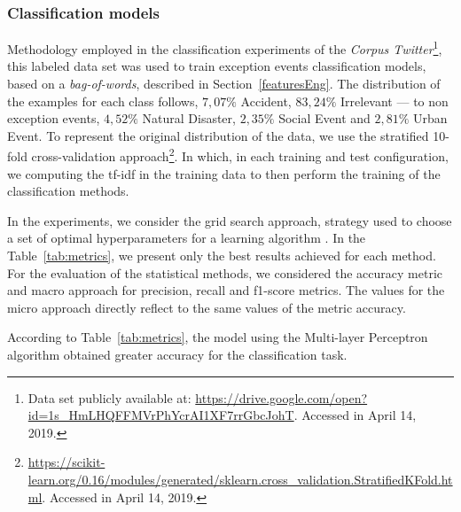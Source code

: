 \documentclass[runningheads]{llncs}
\begin{document}
\subsubsection{Classification models}


\label{Experiments_Corpus_Twitter}
Methodology employed in the classification experiments of the \textit{Corpus Twitter}\footnote{Data set publicly available at: \url{https://drive.google.com/open?id=1s_HmLHQFFMVrPhYcrAI1XF7rrGbcJohT}. Accessed in April 14, 2019.}, this labeled data set was used to train exception events classification models, based on a \textit{bag-of-words}, described in Section~\ref{featuresEng}. %
The distribution of the examples for each class follows, $7,07\%$ Accident, $83,24\%$ Irrelevant --- to non exception events, $4,52\%$ Natural Disaster, $2,35\%$ Social Event and $2,81\%$ Urban Event. To represent the original distribution of the data, we use the stratified 10-fold cross-validation approach\footnote{\url{https://scikit-learn.org/0.16/modules/generated/sklearn.cross_validation.StratifiedKFold.html}. Accessed in April 14, 2019.}. In which, in each training and test configuration, we computing the tf-idf in the training data to then perform the training of the classification methods.

In the experiments, we consider the grid search approach, strategy used to choose a set of optimal hyperparameters for a learning algorithm \cite{james2013introduction}. In the Table~\ref{tab:metrics}, we present only the best results achieved for each method. For the evaluation of the statistical methods, we considered the accuracy metric and macro approach for precision, recall and f1-score metrics. The values for the micro approach directly reflect to the same values of the metric accuracy.





 According to Table~\ref{tab:metrics}, the model using the Multi-layer Perceptron algorithm obtained greater accuracy for the classification task. 

\end{document}
